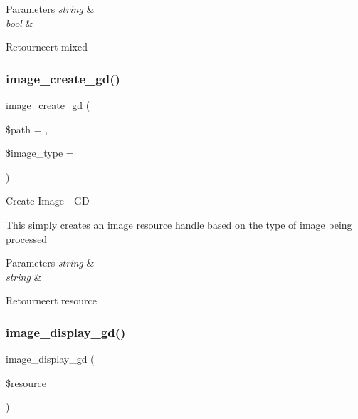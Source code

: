 \begin{DoxyParams}{Parameters}
{\em string} & \\
\hline
{\em bool} & \\
\hline
\end{DoxyParams}
\begin{DoxyReturn}{Retourneert}
mixed 
\end{DoxyReturn}
\mbox{\label{class_c_i___image__lib_a1a222111448274ffca4e59d8a473c5fc}} 
\subsubsection{\texorpdfstring{image\_create\_gd()}{image\_create\_gd()}}
{\footnotesize\ttfamily image\+\_\+create\+\_\+gd (\begin{DoxyParamCaption}\item[{}]{\$path = {\ttfamily \textquotesingle{}\textquotesingle{}},  }\item[{}]{\$image\+\_\+type = {\ttfamily \textquotesingle{}\textquotesingle{}} }\end{DoxyParamCaption})}

Create Image -\/ GD

This simply creates an image resource handle based on the type of image being processed


\begin{DoxyParams}{Parameters}
{\em string} & \\
\hline
{\em string} & \\
\hline
\end{DoxyParams}
\begin{DoxyReturn}{Retourneert}
resource 
\end{DoxyReturn}
\mbox{\label{class_c_i___image__lib_af641d1806701b178dfba3dbf7da54462}} 
\subsubsection{\texorpdfstring{image\_display\_gd()}{image\_display\_gd()}}
{\footnotesize\ttfamily image\+\_\+display\+\_\+gd (\begin{DoxyParamCaption}\item[{}]{\$resource }\end{DoxyParamCaption})}

